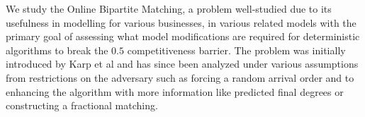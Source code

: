 We study the Online Bipartite Matching, a problem well-studied due to its usefulness in modelling for various businesses, in various related models with the primary goal of assessing what model modifications are required for deterministic algorithms to break the $0.5$ competitiveness barrier. The problem was initially introduced by Karp et al and has since been analyzed under various assumptions from restrictions on the adversary such as forcing a random arrival order and to enhancing the algorithm with more information like predicted final degrees or constructing a fractional matching.